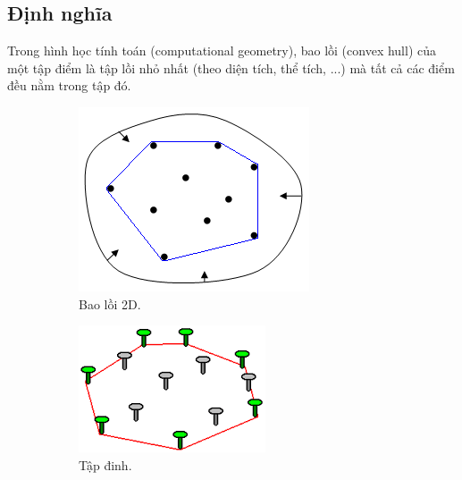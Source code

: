 \documentclass[12pt]{article}
\begin{document}
      \subsection{Định nghĩa} 
        Trong hình học tính toán (computational geometry), 
        bao lồi (convex hull) của một tập điểm là tập lồi nhỏ nhất (theo diện tích, thể tích, ...) mà tất cả các điểm đều nằm trong tập đó.
        \begin{figure}[!ht]
          \centering
          \begin{subfigure}[b]{0.35\linewidth}
            \includegraphics[width=\linewidth]{Image/ConvexHull}
            \caption{Bao lồi 2D.}
            \label{fig:ch2d}
          \end{subfigure}
          \begin{subfigure}[b]{0.35\linewidth}
            \includegraphics[width=\linewidth]{Image/ch_nail}
            \caption{Tập đinh.}
            \label{fig:chnail}
          \end{subfigure}
          \caption{}
        \end{figure}
\end{document}
